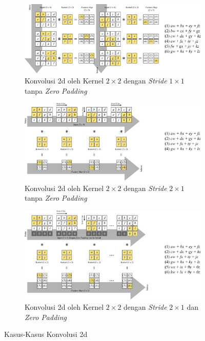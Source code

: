 \begin{figure}
    \centering
    \begin{subfigure}[t]{14cm}
        \includegraphics[width=14cm]{gambar/contoh_konvolusi1.png}
        \caption{\footnotesize Konvolusi \acrshort{2d} oleh Kernel $2 \times 2$ dengan \textit{Stride} $1 \times 1$ tanpa \textit{Zero Padding}}
        \label{fig:konvolusi1}
    \end{subfigure}
    \begin{subfigure}[t]{14cm}
        \includegraphics[width=14cm]{gambar/contoh_konvolusi2.png}
        \caption{\footnotesize Konvolusi \acrshort{2d} oleh Kernel $2 \times 2$ dengan \textit{Stride} $2 \times 1$ tanpa \textit{Zero Padding}}
        \label{fig:konvolusi2}
    \end{subfigure}
    \begin{subfigure}[t]{14cm}
        \includegraphics[width=14cm]{gambar/contoh_konvolusi3.png}
        \caption{\footnotesize Konvolusi \acrshort{2d} oleh Kernel $2 \times 2$ dengan \textit{Stride} $2 \times 1$ dan \textit{Zero Padding}}
        \label{fig:konvolusi3}
    \end{subfigure}
    \caption[Kasus-Kasus Konvolusi \acrshort{2d}]{Kasus-Kasus Konvolusi \acrshort{2d} \protect{}}
    \label{fig:contoh_konvolusi}
\end{figure}
